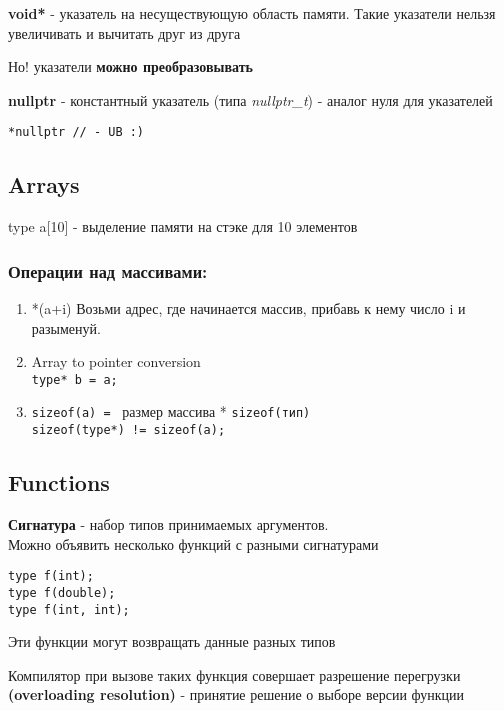 \documentclass[12pt, a5paper]{article}
\begin{document}
\textbf{void*} - указатель на несуществующую область памяти. Такие указатели нельзя увеличивать и вычитать друг из друга

\begin{center}
Но! указатели \textbf{можно преобразовывать}
\end{center}

\textbf{nullptr} - константный указатель (типа \textit{nullptr\_t}) - аналог нуля для указателей

\texttt{*nullptr // - UB :)}

\subsection{Arrays}

type a[10] - выделение памяти на стэке для 10 элементов

\subsubsection{Операции над массивами:} 
\begin{enumerate}
\item *(a+i) Возьми адрес, где начинается массив, прибавь к нему число i и разыменуй.
\item Array to pointer conversion 
\\
\texttt{type* b = a;}
\item \texttt{sizeof(a) = } размер массива * \texttt{sizeof(тип)}
\\
\texttt{sizeof(type*) != sizeof(a);}
\end{enumerate}

\subsection{Functions}

\textbf{Сигнатура} - набор типов принимаемых аргументов.
\\
Можно объявить несколько функций с разными сигнатурами
\begin{lstlisting}
type f(int);
type f(double);
type f(int, int);
\end{lstlisting}
\begin{center}
Эти функции могут возвращать данные разных типов
\end{center}

Компилятор при вызове таких функция совершает разрешение перегрузки \textbf{(overloading resolution)} - принятие решение о выборе версии функции
\end{document}
